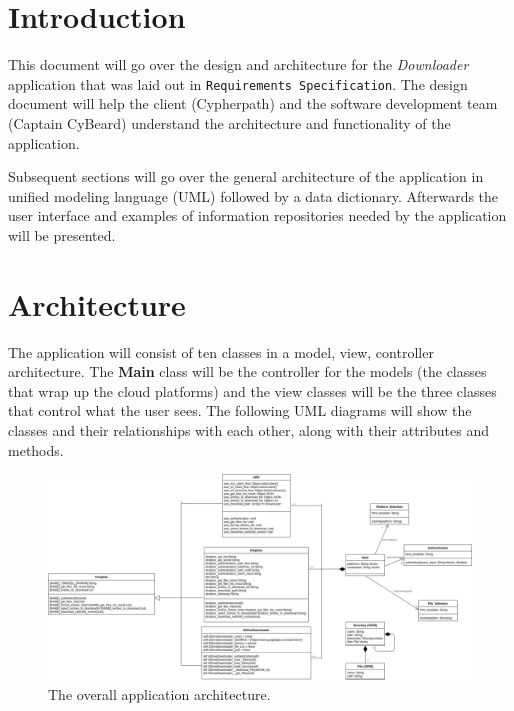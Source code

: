 \documentclass{article}
\title{}
\author{}
\date{}
\begin{document}



\tableofcontents
\newpage
\listoffigures
\newpage

\begin{versionhistory}
\end{versionhistory}
\newpage

\section{Introduction}
This document will go over the design and architecture for the \textit{Downloader} application that was laid out in
\texttt{Requirements Specification}\cite{reqs}. The design document will help the client (Cypherpath) and the
software development team (Captain CyBeard) understand the architecture and functionality of the application.

Subsequent sections will go over the general architecture of the application in unified modeling language
(UML) followed by a data dictionary. Afterwards the user interface and examples of information repositories needed
by the application will be presented.

\section{Architecture}
The application will consist of ten classes in a model, view, controller architecture. The \textbf{Main} class will be
the controller for the models (the classes that wrap up the cloud platforms) and the view classes will be the three
classes that control what the user sees. The following UML diagrams will show the classes and their relationships with
each other, along with their attributes and methods.


\begin{figure}[H]
\includegraphics[scale=.25]{des_all}
\centering
\caption{The overall application architecture.}
\end{figure}
\end{document}
